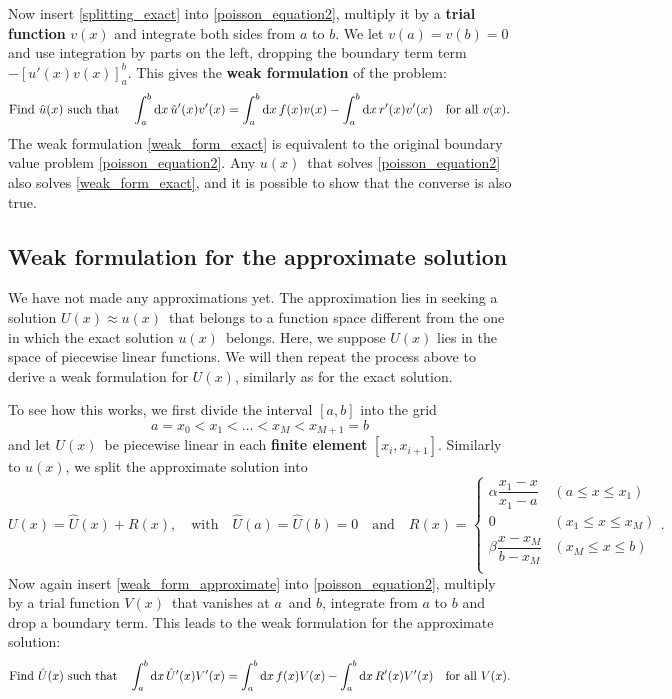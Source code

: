 Now insert \ref{splitting_exact} into \cref{poisson_equation2}, multiply it by a \textbf{trial function} $v(x)$ and integrate both sides from $a$ to $b$.
We let $v(a) = v(b) = 0$ and use integration by parts on the left, dropping the boundary term term $-[u'(x) v(x)]_a^b$.
This gives the \textbf{weak formulation} of the problem:
\newcommand{\weakform}[3]{
\text{Find} \,\, \hat{#1}(x) \,\, \text{such that}
\quad
\integral{\hat{#1}'(x) #2'(x)}{x}{a}{b} = \integral{f(x) #2(x)}{x}{a}{b} - \integral{#3'(x) #2'(x)}{x}{a}{b}
\quad
\text{for all} \,\, #2(x)
}
\begin{equation}
	\weakform{u}{v}{r}.
	\label{weak_form_exact}
\end{equation}
The weak formulation \ref{weak_form_exact} is equivalent to the original boundary value problem \ref{poisson_equation2}.
Any $u(x)$ that solves \ref{poisson_equation2} also solves \ref{weak_form_exact}, and it is possible to show that the converse is also true.

\subsection{Weak formulation for the approximate solution}

We have not made any approximations yet.
The approximation lies in seeking a solution $U(x) \approx u(x)$ that belongs to a function space different from the one in which the exact solution $u(x)$ belongs.
Here, we suppose $U(x)$ lies in the space of piecewise linear functions.
We will then repeat the process above to derive a weak formulation for $U(x)$, similarly as for the exact solution.

To see how this works, we first divide the interval $[a, b]$ into the grid
\begin{equation}
	a = x_0 < x_1 < \dots < x_M < x_{M+1} = b
	\label{fem_grid}
\end{equation}
and let $U(x)$ be piecewise linear in each \textbf{finite element} $[x_i, x_{i+1}]$.
Similarly to $u(x)$, we split the approximate solution into
\begin{equation}
	U(x) = \hat{U}(x) + R(x), \quad \text{with} \quad \hat{U}(a) = \hat{U}(b) = 0 \quad \text{and} \quad R(x) = 
	\begin{cases}
		\alpha \dfrac{x_1-x}{x_1-a} & (a \leq x \leq x_1)   \\
		0                           & (x_1 \leq x \leq x_M) \\
		\beta  \dfrac{x-x_M}{b-x_M} & (x_M \leq x \leq b)   \\
	\end{cases}
	.
	\label{weak_form_approximate}
\end{equation}
Now again insert \ref{weak_form_approximate} into \ref{poisson_equation2}, multiply by a trial function $V(x)$ that vanishes at $a$ and $b$, integrate from $a$ to $b$ and drop a boundary term.
This leads to the weak formulation for the approximate solution:
\begin{equation}
	\weakform{U}{V}{R}.
	\label{weak_form_approximate}
\end{equation}

